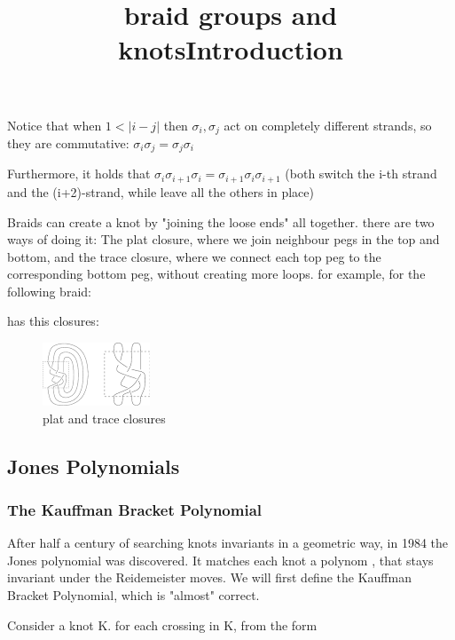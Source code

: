 \documentclass{article}
\begin{document}
Notice that when $1 < |i - j|$ then $\sigma_{i}, \sigma_{j}$ act on completely different strands, so they are commutative: $\sigma_{i}\sigma_{j} = \sigma_{j}\sigma_{i}$

Furthermore, it holds that $\sigma_{i}\sigma_{i+1}\sigma_{i} = \sigma_{i+1}\sigma_{i}\sigma_{i+1}$
(both switch the i-th strand and the (i+2)-strand, while leave all the others in place)


\title{braid groups and knots}
Braids can create a knot by "joining the loose ends" all together. there are two ways of doing it:
The plat closure, where we join neighbour pegs in the top and bottom, and the trace closure, where we connect each top peg to the corresponding bottom peg, without creating more loops.
for example, for the following braid: 

\begin{center}
\end{center} 
has this closures:
\begin{figure}
\includegraphics[scale=0.5]{closures} 
\caption{plat and trace closures}
\end{figure}

\subsection{Jones Polynomials} 
\subsubsection{The Kauffman Bracket Polynomial}
\title{Introduction}
After half a century of searching knots invariants in a geometric way, in 1984 the Jones polynomial
was discovered. It matches each knot a polynom , that stays invariant under the Reidemeister moves.
We will first define the Kauffman Bracket Polynomial, which is "almost" correct.

Consider a knot K. for each crossing in K, from the form 
\begin{center}
\end{center} 
\end{document}
